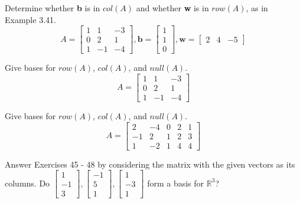 \documentclass[12pt,letterpaper]{hmcpset}
\begin{document}

\begin{problem}[3.5.12]
Determine whether \textbf{b} is in $col(A)$ and whether \textbf{w} is in $row(A)$, as in Example 3.41.
$$A = \begin{bmatrix}
	1 & 1 & -3 \\
	0 & 2 & 1 \\
	1 & -1 & -4 
\end{bmatrix}, \mathbf{b} = \begin{bmatrix}
1 \\ 1 \\ 0 \end{bmatrix}, \mathbf{w} = \begin{bmatrix}
2 & 4 & -5 \end{bmatrix}
 $$
\end{problem}

\begin{solution}
\vfill
\end{solution}
\newpage

\begin{problem}[3.5.18]
Give bases for $row(A)$, $col(A)$, and $null(A)$.
$$A = \begin{bmatrix}
1 & 1 & -3 \\
0 & 2 & 1 \\
1 & -1 & -4
\end{bmatrix}$$
\end{problem}

\begin{solution}
\vfill
\end{solution}
\newpage

\begin{problem}[3.5.20]
Give bases for $row(A)$, $col(A)$, and $null(A)$.
$$A = \begin{bmatrix}
2 & -4 & 0 & 2 & 1 \\
-1 & 2 & 1 & 2 & 3 \\
1 & -2 & 1 & 4 & 4
\end{bmatrix}$$
\end{problem}

\begin{solution}
\vfill
\end{solution}
\newpage

\begin{problem}[3.5.46]
Answer Exercises 45 - 48 by considering the matrix with the given vectors as its columns. Do $\begin{bmatrix} 1 \\ -1 \\ 3 \end{bmatrix}, \begin{bmatrix} -1 \\ 5 \\ 1 \end{bmatrix}, \begin{bmatrix} 1 \\ -3 \\ 1 \end{bmatrix}$ form a basis for $\mathbb{R}^3$?
\end{problem}
\end{document}
